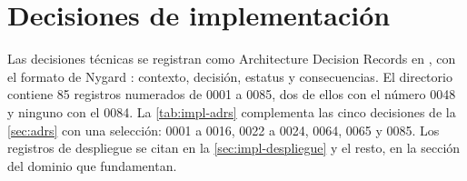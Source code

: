 
\section{Decisiones de implementación}\label{sec:impl-divergencias}

Las decisiones técnicas se registran como Architecture Decision Records en , con el formato de Nygard \cite{nygard2011}: contexto, decisión, estatus y consecuencias. El directorio contiene 85 registros numerados de 0001 a 0085, dos de ellos con el número 0048 y ninguno con el 0084. La \cref{tab:impl-adrs} complementa las cinco decisiones de la \cref{sec:adrs} con una selección: 0001 a 0016, 0022 a 0024, 0064, 0065 y 0085. Los registros de despliegue se citan en la \cref{sec:impl-despliegue} y el resto, en la sección del dominio que fundamentan.

\begingroup

